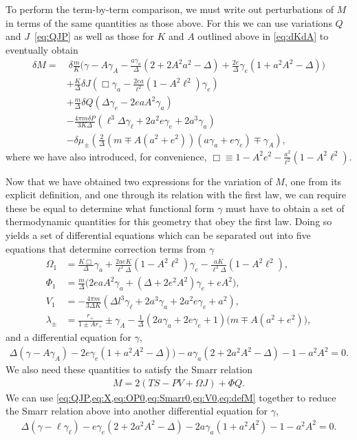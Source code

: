 \documentclass[
twoside,
openright,
frontopenright,
]{dmathesis}
\newcommand{\nn}{\nonumber}
\begin{document}
To perform the term-by-term comparison, we must write out perturbations of $M$
in terms of the same quantities as those above. For this we can use variations
$Q$ and $J$~\eqref{eq:QJP} as well as those for $K$ and $A$ outlined above in
\cref{eq:dKdA} to eventually obtain 
\begin{align}
\delta M = &~\delta\frac{m}{K}\bigg(\gamma-A\gamma_{A}-\frac{a\gamma_{a}}{\Delta}(2+2A^2a^2-\Delta)+\frac{2e}{\Delta}\gamma_{e}(1+a^2A^2-\Delta)\bigg) \nn\\
&+\frac{K}{\Delta}\delta J\left(\Box\gamma_{a}-\frac{2ea}{\ell^2}(1-A^2\ell^2)\gamma_{e}\right) \nn\\
&+\frac{m}{\Delta}\delta Q\left(\Delta \gamma_e-2eaA^2\gamma_a\right) \nn\\
&-\frac{4\pi m\delta P}{3K\Delta} \left(\ell^3 \Delta\gamma_\ell + 2a^2 e \gamma_e
+2a^3  \gamma_a\right)\nn\\
&-\delta \mu_\pm \left(\frac{2}{\Delta}\left(m\mp A(a^2+e^2)\right)(a\gamma_a + e\gamma_e) \mp \gamma_A\right),
\label{eq:dM2}
\end{align}
where we have also introduced, for convenience, $\Box \equiv 1-A^2e^2 -\frac{a^2}{\ell^2}(1-A^2\ell^2)$.

Now that we have obtained two expressions for the variation of $M$, one from its
explicit definition, and one through its relation with the first law, we can
require these be equal to determine what functional form $\gamma$ must have to
obtain a set of thermodynamic quantities for this geometry that obey the first
law.  Doing so yields a set of differential equations which can be separated out
into five equations that determine correction terms from $\gamma$
\begin{align}
\Omega_1 &= \frac{K\Box}{\Delta}\gamma_a + \frac{2 a e
           K}{\ell^2\Delta}(1-A^2\ell^2)\gamma_{e} - \frac{a K}{\ell^2\Delta}
           (1-A^2\ell^2),\nn\\ 
\Phi_1 &= \frac{m}{\Delta} \Big(2 e a A^2\gamma_{a}+(\Delta+2
         e^2A^2)\gamma_{e}+eA^2\Big), \nn\\
V_1 &= -\frac{4 \pi  m }{3 \Delta K}(\Delta l^3 \gamma_{\ell}+2 a^3 \gamma_{a}+2 a^2 e \gamma_{e}+a^2),\nn\\
\lambda_\pm &= \frac{r_+}{1\pm Ar_+}\pm \gamma_{A} - \frac{1}{\Delta}(2a\gamma_{a} + 2e \gamma_{e} + 1)\big(m\mp A(a^2+e^2)\big) ,
\label{eq:corrTermsWithGamma}
\end{align}
and a differential equation for $\gamma$, 
\begin{align}\label{eq:diffg1}
\Delta(\gamma-A\gamma_{A})-2e\gamma_{e}(1+a^2A^2-\Delta))-a\gamma_{a}(2+2a^2A^2-\Delta)-1-a^2A^2=0.
\end{align}
We also need these quantities to satisfy the Smarr relation
\begin{align}
M=2(TS-PV+\Omega J) + \Phi Q.
\end{align}
We can use \cref{eq:QJP,eq:X,eq:OP0,eq:Smarr0,eq:V0,eq:defM} together to reduce
the Smarr relation above into another differential equation for $\gamma$, 
\begin{align}\label{eq:diffg2}
\Delta(\gamma - \ell\gamma_{\ell}) - e\gamma_{e}(2+2a^2A^2-\Delta)-2a\gamma_{a}(1+a^2A^2)-1-a^2A^2 = 0.
\end{align}
\end{document}
